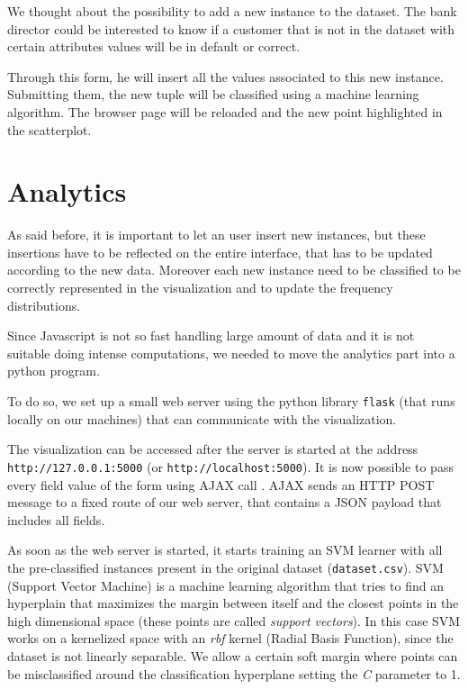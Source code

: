 \documentclass[journal]{vgtc}                %
\begin{document}
We thought about the possibility to add a new instance to the dataset. The bank director could be interested to know if a customer that is not in the dataset with certain attributes values
will be in default or correct.

Through this form, he will insert all the values associated to this new instance. Submitting them, the new tuple will be classified
using a machine learning algorithm. The browser page will be reloaded and the new point highlighted in the scatterplot.

\section{Analytics}

As said before, it is important to let an user insert new instances, but these insertions have to be reflected on the entire interface, that has to be updated according to the new data.
Moreover each new instance need to be classified to be correctly represented in the visualization and to update the frequency distributions.

Since Javascript is not so fast handling large amount of data and it is not suitable doing intense computations, we needed to move the analytics part into a python program.

To do so, we set up a small web server using the python library \texttt{flask} (that runs locally on our machines) that can communicate with the visualization.

The visualization can be accessed after the server is started at the address \texttt{http://127.0.0.1:5000} (or \texttt{http://localhost:5000}). It is now possible to pass every field value of the form
using AJAX call \cite{ajax:2018}. AJAX sends an HTTP POST message to a fixed route of our web server, that contains a JSON payload that includes all fields.

As soon as the web server is started, it starts training an SVM learner with all the pre-classified instances present in the original dataset (\texttt{dataset.csv}).
SVM (Support Vector Machine) \cite{Boser:1992:TAO:130385.130401} \cite{sklearn:2018} is a machine learning algorithm that tries to find an hyperplain that maximizes the margin between itself and the closest points in the high dimensional space (these points are called \textit{support vectors}). In this case
SVM works on a kernelized space with an \textit{rbf} kernel (Radial Basis Function), since the dataset is not linearly separable.
We allow a certain soft margin where points can be misclassified around the classification hyperplane setting the \textit{C} parameter to 1.
\end{document}
